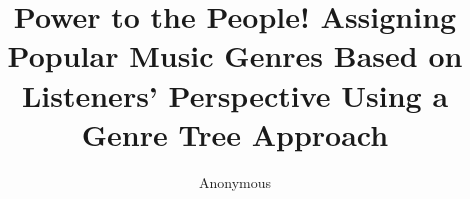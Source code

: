 

\title{Power to the People!  Assigning Popular Music Genres Based on Listeners' Perspective Using a Genre Tree Approach}
%

\author{Anonymous}

\date{}




%

